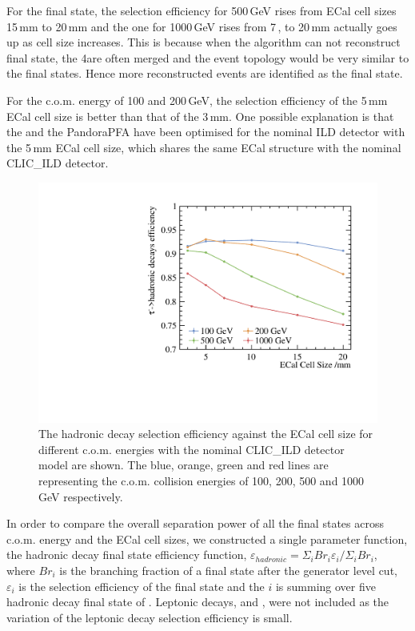 \documentclass[a4paper,11pt]{article}
\begin{document}
For the \Pphoton\Pnut final state, the selection efficiency for 500\,GeV rises from ECal cell sizes 15\,mm to 20\,mm and the one for 1000\,GeV rises from 7\,, to 20\,mm actually goes up as cell size increases. This is because when the algorithm can not reconstruct \Pphoton\Pnut final state, the 4\Pphoton are often merged and the event topology would be very similar to the \Pphoton\Pnut final states. Hence more reconstructed events are identified as the \Pphoton\Pnut final state.

For the c.o.m. energy of 100 and 200\,GeV, the selection efficiency of the 5\,mm ECal cell size is better than that of the 3\,mm. One possible explanation is that the  and the PandoraPFA have been optimised for the nominal ILD detector with the 5\,mm ECal cell size, which shares the same ECal structure with the nominal CLIC\_ILD detector.

\begin{figure}[htbp]
\centering %
\includegraphics[width=.45\textwidth]{plots/hadronicEff}
\caption{\label{fig:hadronic_efficiency} The \Ptau hadronic decay selection efficiency against the ECal cell size for different c.o.m. energies with the nominal CLIC\_ILD detector model are shown. The blue, orange, green and red lines are representing the c.o.m. \Pelectron\APelectron collision energies of 100, 200, 500 and 1000\,GeV respectively.}
\end{figure}

In order to compare the overall separation power of all the final states across c.o.m. energy and the ECal cell sizes, we constructed a single parameter function, the  \Ptau hadronic decay final state efficiency function, $\varepsilon_{hadronic} = \Sigma_{i} {Br}_{i}\varepsilon_{i} / \Sigma_{i} {Br}_{i}$, where $Br_{i}$ is the branching fraction of a final state after the generator level cut, $\varepsilon_{i}$ is the selection efficiency of the final state and the $i$ is summing over five hadronic decay final state of \Ptau. Leptonic decays, \Pelectron and \Pmuon, were not included as the variation of the leptonic decay selection efficiency is small.
\end{document}

